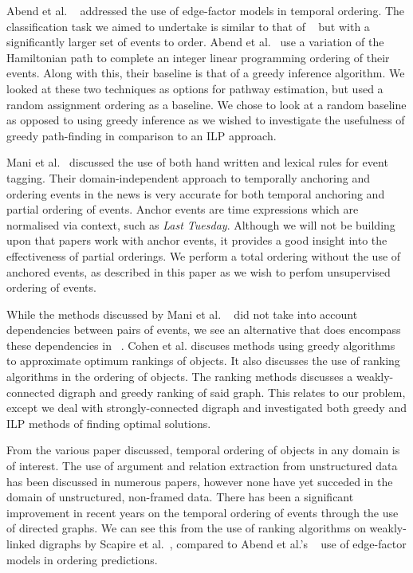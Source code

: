 \documentclass[bsc,frontabs,twoside,singlespacing,parskip,deptreport]{infthesis}     %
\begin{document}
Abend et al. ~\cite{abend2015lexical} addressed the use of
edge-factor models in temporal ordering. The classification task we aimed to undertake is similar to that of ~\cite{abend2015lexical}
but with a significantly larger set of events to order.
Abend et al.~\cite{abend2015lexical} use a variation of the Hamiltonian path
to complete an integer linear programming ordering of their events. Along with this, their baseline is that of a greedy inference algorithm.
We looked at these two techniques as options for pathway estimation, but used a random assignment ordering as
a baseline. We chose to look at a random baseline as opposed to using greedy inference as
we wished to investigate the usefulness of greedy path-finding in comparison to an ILP approach.

Mani et al.~\cite{mani2006machine} discussed the use of both hand written and lexical rules for event tagging.
Their domain-independent approach to temporally anchoring and ordering events in the news is very accurate for both temporal
anchoring and partial ordering of events. Anchor events are time expressions which are normalised via
context, such as \textit{Last Tuesday}. Although we will not be building upon that papers work with
anchor events, it provides a good insight into the effectiveness of
partial orderings. We perform a total ordering without the use of anchored events, as described in this paper
as we wish to perfom unsupervised ordering of events.

While the methods discussed by Mani et al. ~\cite{mani2006machine} did not take into account dependencies between pairs of events, 
we see an alternative that does encompass
these dependencies in ~\cite{schapire1998learning}.
Cohen et al. discuses methods using greedy algorithms to approximate optimum rankings of objects.
It also discusses the use of ranking algorithms in the ordering of objects. The ranking methods discusses a
weakly-connected digraph and greedy ranking of said graph. This relates to our problem,
except we deal with strongly-connected digraph and investigated both greedy and ILP methods of finding
optimal solutions.


From the various paper discussed, temporal ordering of objects in any domain is of interest.
The use of argument and relation extraction from unstructured data has been discussed in numerous papers,
however none have yet succeded in the domain of unstructured, non-framed data.
There has been a significant improvement in recent years on the temporal ordering of events through the use of
directed graphs. We can see this from the use of ranking algorithms on weakly-linked
digraphs by Scapire et al.~\cite{schapire1998learning}, compared to Abend et al.'s ~\cite{abend2015lexical} use of edge-factor models in ordering predictions. 
\end{document}
